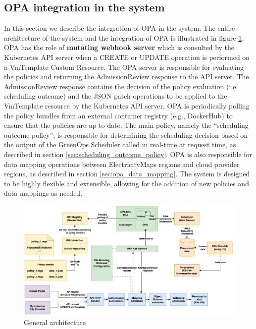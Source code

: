 \subsection{OPA integration in the system}

In this section we describe the integration of OPA in the system.
The entire architecture of the system and the integration of OPA is illustrated in figure \ref{fig:architecture}.
OPA has the role of \textbf{mutating webhook server} which is consulted by the Kubernetes API server when a CREATE or UPDATE operation is performed on a VmTemplate Custom Resource.
The OPA server is responsible for evaluating the policies and returning the AdmissionReview response to the API server.
The AdmissionReview response contains the decision of the policy evaluation (i.e. scheduling outcome) and the JSON patch operations to be applied to the VmTemplate resource by the Kubernetes API server.
OPA is periodically polling the policy bundles from an external container registry (e.g., DockerHub) to ensure that the policies are up to date.
The main policy, namely the ``scheduling outcome policy'', is responsible for determining the scheduling decision based on the output of the GreenOps Scheduler called in real-time at request time, as described in section \ref{sec:scheduling_outcome_policy}.
OPA is also responsible for data mapping operations between ElectricityMaps regions and cloud provider regions, as described in section \ref{sec:opa_data_mapping}.
The system is designed to be highly flexible and extensible, allowing for the addition of new policies and data mappings as needed.

\begin{figure}[htb]
\centering
\includegraphics[width=1\linewidth]{images/architecture.png}
\caption{General architecture}
\label{fig:architecture}
\end{figure}

